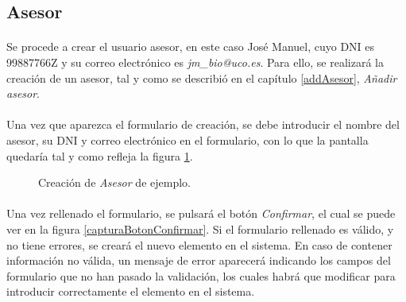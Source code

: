 \subsection{Asesor}

  \paragraph{}Se procede a crear el usuario asesor, en este caso José Manuel,
  cuyo DNI es 99887766Z y su correo electrónico es \textit{jm\_bio@uco.es}. Para
  ello, se realizará la creación de un asesor, tal y como se describió en el
  capítulo \ref{addAsesor}, \textit{Añadir asesor}.

  \paragraph{}Una vez que aparezca el formulario de creación, se debe introducir
  el nombre del asesor, su DNI y correo electrónico en el formulario, con lo que
  la pantalla quedaría tal y como refleja la figura \ref{ejemploAddAsesor}.

  \begin{figure}[!ht]
    \begin{center}
      \caption{Creación de \textit{Asesor} de ejemplo.}
      \label{ejemploAddAsesor}
    \end{center}
  \end{figure}

  \paragraph{}Una vez rellenado el formulario, se pulsará el botón
  \textit{Confirmar}, el cual se puede ver en la figura
  \ref{capturaBotonConfirmar}. Si el formulario rellenado es válido, y no tiene
  errores, se creará el nuevo elemento en el sistema. En caso de contener
  información no válida, un mensaje de error aparecerá indicando los campos
  del formulario que no han pasado la validación, los cuales habrá que modificar
  para introducir correctamente el elemento en el sistema.
